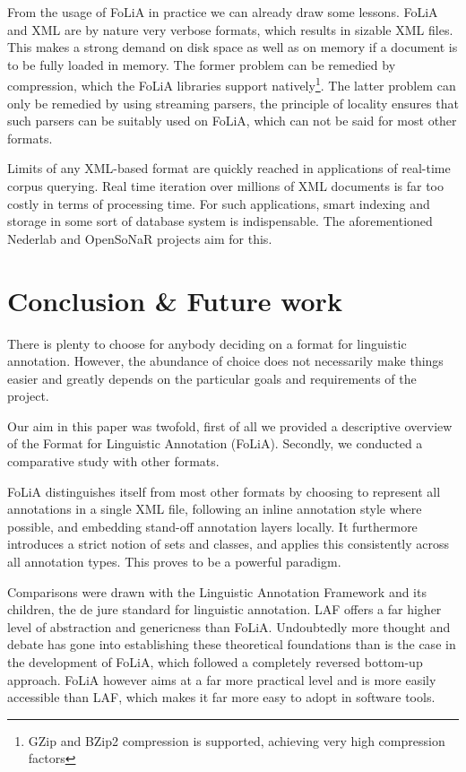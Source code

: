 \documentclass[a4paper,10pt,twoside]{article}
\begin{document}
From the usage of FoLiA in practice we can already draw some lessons. FoLiA and
XML are by nature very verbose formats, which results in sizable XML files.
This makes a strong demand on disk space as well as on memory if a document is
to be fully loaded in memory. The former problem can be remedied by
compression, which the FoLiA libraries support natively\footnote{GZip and BZip2
compression is supported, achieving very high compression factors}. The latter
problem can only be remedied by using streaming parsers, the principle of
locality ensures that such parsers can be suitably used on FoLiA, which can not
be said for most other formats.

Limits of any XML-based format are quickly reached in applications of real-time corpus
querying. Real time iteration over millions of XML documents is far too costly in terms
of processing time. For such applications, smart indexing and storage in some sort of
database system is indispensable. The aforementioned Nederlab and OpenSoNaR
projects aim for this. 

\section{Conclusion \& Future work}

There is plenty to choose for anybody deciding on a format for
linguistic annotation. However, the abundance of choice does not necessarily make
things easier and greatly depends on the particular goals and requirements of the
project.  

Our aim in this paper was twofold, first of all we provided a descriptive
overview of the Format for Linguistic Annotation (FoLiA). Secondly, we
conducted a comparative study with other formats.

FoLiA distinguishes itself from most other formats by choosing to represent
all annotations in a single XML file, following an inline annotation style where
possible, and embedding stand-off annotation layers locally. It furthermore
introduces a strict notion of sets and classes, and applies this consistently
across all annotation types. This proves to be a powerful paradigm.

Comparisons were drawn with the Linguistic Annotation Framework and its
children, the de jure standard for linguistic annotation. LAF offers a far
higher level of abstraction and genericness than FoLiA. Undoubtedly more
thought and debate has gone into establishing these theoretical foundations
than is the case in the development of FoLiA, which followed a completely
reversed bottom-up approach. FoLiA however aims at a far more practical level and is
more easily accessible than LAF, which makes it far more easy to adopt in
software tools. 
\end{document}
